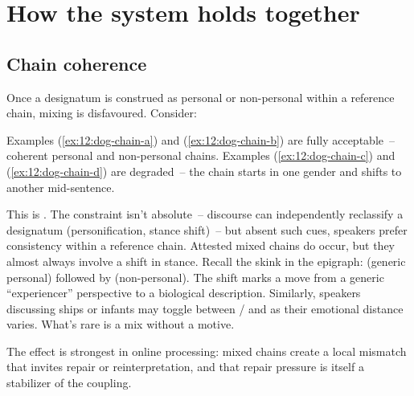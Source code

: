 \section{How the system holds together}
\label{sec:12:coupling}

\subsection{Chain coherence}
\label{sec:12:chain-coherence}

Once a designatum is construed as personal or non-personal within a reference chain, mixing is disfavoured. Consider:

\z
{}
\z
{}
\z
{}
\z
Examples (\ref{ex:12:dog-chain-a}) and (\ref{ex:12:dog-chain-b}) are fully acceptable~-- coherent personal and non-personal chains. Examples (\ref{ex:12:dog-chain-c}) and (\ref{ex:12:dog-chain-d}) are degraded~-- the chain starts in one gender and shifts to another mid-sentence.

This is . The constraint isn't absolute~-- discourse can independently reclassify a designatum (personification, stance shift)~-- but absent such cues, speakers prefer consistency within a reference chain. Attested mixed chains do occur, but they almost always involve a shift in stance. Recall the skink in the epigraph:  (generic personal) followed by  (non-personal). The shift marks a move from a generic \enquote{experiencer} perspective to a biological description. Similarly, speakers discussing ships or infants may toggle between / and  as their emotional distance varies. What's rare is a mix without a motive.

The effect is strongest in online processing: mixed chains create a local mismatch that invites repair or reinterpretation, and that repair pressure is itself a stabilizer of the coupling.

